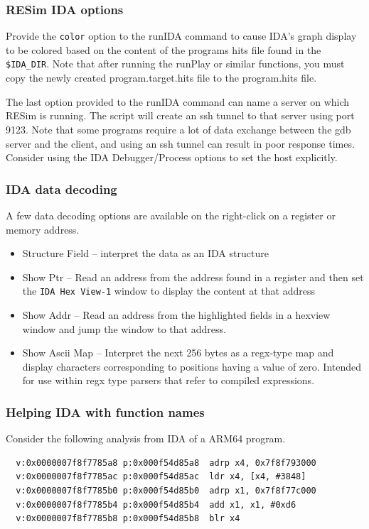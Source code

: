 \documentclass[titlepage]{article}
\begin{document}
\subsubsection{RESim IDA options}
Provide the {\tt color} option to the runIDA command to cause IDA's graph display to be colored based on the content of the
programs hits file found in the {\tt \$IDA\_DIR}.  Note that after running the runPlay or similar functions, you must copy the
newly created program.target.hits file to the program.hits file.

The last option provided to the runIDA command can name a server on which RESim is running. The script will create an ssh tunnel to that
server using port 9123.  Note that some programs require a lot of data exchange between the gdb server and the client, and using an ssh 
tunnel can result in poor response times.  Consider using the IDA Debugger/Process options to set the host explicitly.

\subsubsection{IDA data decoding}
A few data decoding options are available on the right-click on a register or memory address.
\begin{itemize}
\item Structure Field -- interpret the data as an IDA structure
\item Show Ptr -- Read an address from the address found in a register and then set the {\tt IDA Hex View-1} window to display the content at that address
\item Show Addr -- Read an address from the highlighted fields in a hexview window and jump the window to that address.
\item Show Ascii Map -- Interpret the next 256 bytes as a regx-type map and display characters corresponding to positions having a value of zero.  Intended
for use within regx type parsers that refer to compiled expressions.
\end{itemize}

\subsubsection{Helping IDA with function names}
Consider the following analysis from IDA of a ARM64 program.
\begin{verbatim}
  v:0x0000007f8f7785a8 p:0x000f54d85a8  adrp x4, 0x7f8f793000
  v:0x0000007f8f7785ac p:0x000f54d85ac  ldr x4, [x4, #3848]
  v:0x0000007f8f7785b0 p:0x000f54d85b0  adrp x1, 0x7f8f77c000
  v:0x0000007f8f7785b4 p:0x000f54d85b4  add x1, x1, #0xd6
  v:0x0000007f8f7785b8 p:0x000f54d85b8  blr x4
\end{verbatim}
\end{document}
